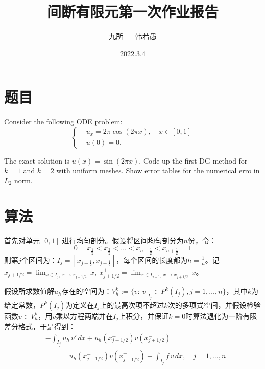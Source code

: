 \documentclass[12pt, a4paper]{ctexart}
\title{间断有限元第一次作业报告}
\author{九所 $\quad$ 韩若愚}
\date{2022.3.4}
\begin{document}
	\maketitle
	
	\section{题目}
	Consider the following ODE problem:
	\begin{equation}
	\begin{cases}
	& u_x = 2 \pi \cos( 2 \pi x), \quad x \in [0,1]\\
	& u(0) = 0.
	\end{cases}
	\end{equation}
	
	The exact solution is $ u(x) = \sin(2 \pi x) $. Code up the first DG method for $k=1$ and $ k =2$ with uniform meshes. Show error tables for the numerical erro in $L_2$ norm.
	
	\section{算法}
	
	首先对单元$[0,1]$ 进行均匀剖分。假设将区间均匀剖分为$n$份，令：
	\begin{equation}
	0 = x_{\frac{1}{2}} < x_{\frac{3}{2}} < \dots < x_{n-\frac{1}{2}} < x_{n+\frac{1}{2}} = 1
	\end{equation}
	则第$j$个区间为：$ I_j = [x_{j- \frac{1}{2}}, x_{j + \frac{1}{2}}]$，每个区间的长度都为$h = \frac{1}{n}$。记$x_{j+1/2}^- = \lim_{x \in I_j, \, x \to x_{j+1/2}} \, x, \  x_{j+1/2}^+ = \lim_{x \in I_{j+1}, \, x \to x_{j+1/2}} \, x$。
	
	假设所求数值解$u_h$存在的空间为：$ V_h^k := \{ v : \  v|_{I_j} \in P^k(I_j), j = 1, \dots, n \}$，其中$k$为给定常数，$P^k(I_j)$为定义在$I_j$上的最高次项不超过$k$次的多项式空间，并假设检验函数$v \in V_h^k$，用$v$乘以方程两端并在$I_j$上积分，并保证$k=0$时算法退化为一阶有限差分格式，于是得到：
	\begin{equation}
	\begin{split}
	& - \int_{I_j} u_h \, v' \, dx + u_h(x_{j+1/2}^-) v(x_{j+1/2}^-) \\
	& \qquad= u_h(x_{j-1/2}^-) v(x_{j-1/2}^+) + \int_{I_j} f \, v \, dx, \quad j = 1, \dots, n
	\end{split}
	\label{1}
	\end{equation}
	
\end{document}
